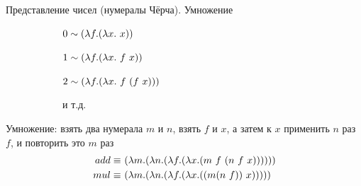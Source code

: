 \begin{frame}{Представление чисел (нумералы Чёрча). Умножение}
\begin{figure}[t]
    \begin{subfigure}[t]{0.35\textwidth}
$ 0 \sim (\lambda f . (\lambda x . \ x))$

$ 1 \sim (\lambda f . (\lambda x . \ f\ x))$

$ 2 \sim (\lambda f . (\lambda x . \ f\ (f\ x)))$

  и т.д.
    \end{subfigure}
    \begin{subfigure}[t]{0.55\textwidth}
    \begin{minipage}{\textwidth}
    \numeralIsFor
    \end{minipage}
    \end{subfigure}
\end{figure}

  \vspace{1cm}


Умножение: взять два нумерала $m$ и $n$, взять $f$ и $x$, а затем к $x$ применить $n$ раз $f$, и повторить это $m$ раз
\vspace{-0.5em}
{\Large \begin{align*}
add \equiv &\ (\lambda m . (\lambda n . (\lambda f . (\lambda x . (m\ f\  (n\ f\  x))))))\\
mul \equiv &\ (\lambda m . (\lambda n . (\lambda f . (\lambda x . ((m (n\ f )){\ x} )))))\\
\end{align*}}
\end{frame}




